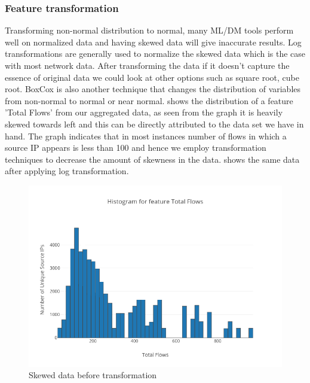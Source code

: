 \subsubsection{Feature transformation} 
Transforming non-normal distribution to normal, many ML/DM tools perform well on normalized data and having skewed data will give inaccurate results. Log transformations are generally used to normalize the skewed data which is the case with most network data. After transforming the data if it doesn't capture the essence of original data we could look at other options such as square root, cube root. BoxCox is also another technique that changes the distribution of variables from non-normal to normal or near normal.  shows the distribution of a feature 'Total Flows' from our aggregated data, as seen from the graph it is heavily skewed towards left and this can be directly attributed to the data set we have in hand. The graph indicates that in most instances number of flows in which a source IP appears is less than 100 and hence we employ transformation techniques to decrease the amount of skewness in the data.   shows the same data after applying log transformation. 

\begin{figure}[t]
	\centerline{\includegraphics[scale = 0.9]{feature.png}}
	\caption{Skewed data before transformation}%
\end{figure}

